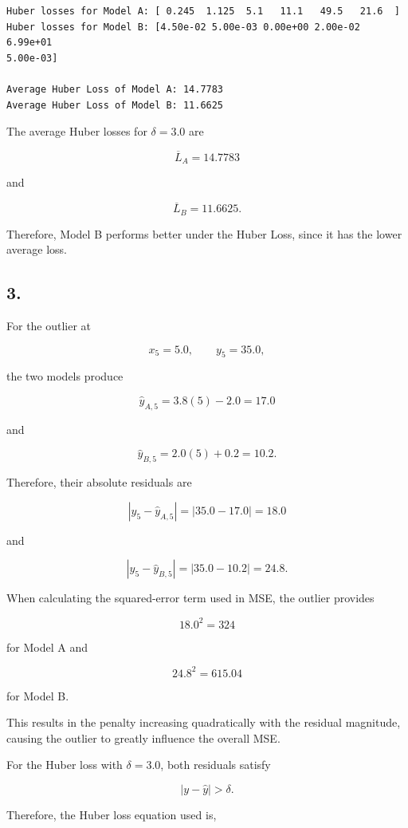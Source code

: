 \documentclass[11pt]{article}
\begin{document}
    \begin{Verbatim}[commandchars=\\\{\}]
Huber losses for Model A: [ 0.245  1.125  5.1   11.1   49.5   21.6  ]
Huber losses for Model B: [4.50e-02 5.00e-03 0.00e+00 2.00e-02 6.99e+01
5.00e-03]

Average Huber Loss of Model A: 14.7783
Average Huber Loss of Model B: 11.6625
    \end{Verbatim}

    The average Huber losses for \(\delta=3.0\) are

\[
\overline{L}_A = 14.7783
\]

and

\[
\overline{L}_B = 11.6625.
\]

Therefore, Model B performs better under the Huber Loss, since it has
the lower average loss.

    \subsection{3.}

For the outlier at

\[
x_5 = 5.0,\qquad y_5 = 35.0,
\]

the two models produce

\[
\hat{y}_{A,5} = 3.8(5)-2.0 = 17.0
\]

and

\[
\hat{y}_{B,5} = 2.0(5)+0.2 = 10.2.
\]

Therefore, their absolute residuals are

\[
|y_5-\hat{y}_{A,5}| = |35.0-17.0| = 18.0
\]

and

\[
|y_5-\hat{y}_{B,5}| = |35.0-10.2| = 24.8.
\]

When calculating the squared-error term used in MSE, the outlier
provides

\[
18.0^2 = 324
\]

for Model A and

\[
24.8^2 = 615.04
\]

for Model B.

This results in the penalty increasing quadratically with the residual
magnitude, causing the outlier to greatly influence the overall MSE.

For the Huber loss with \(\delta=3.0\), both residuals satisfy

\[
|y-\hat{y}|>\delta.
\]

Therefore, the Huber loss equation used is,
\end{document}
